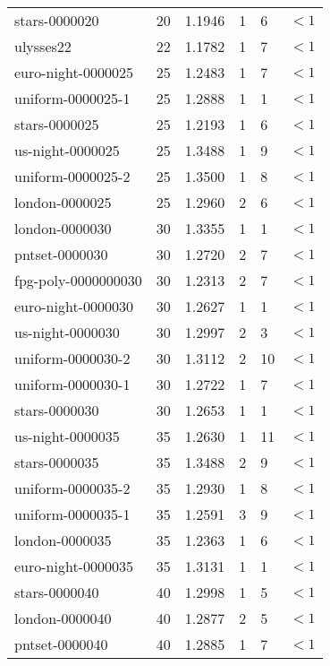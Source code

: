 \begin{longtable}{|lrrlll|}
stars-0000020 & 20 & \num{1.1946} & \num{1} & \num{6} & $<1$ \\
ulysses22 & 22 & \num{1.1782} & \num{1} & \num{7} & $<1$ \\
euro-night-0000025 & 25 & \num{1.2483} & \num{1} & \num{7} & $<1$ \\
uniform-0000025-1 & 25 & \num{1.2888} & \num{1} & \num{1} & $<1$ \\
stars-0000025 & 25 & \num{1.2193} & \num{1} & \num{6} & $<1$ \\
us-night-0000025 & 25 & \num{1.3488} & \num{1} & \num{9} & $<1$ \\
uniform-0000025-2 & 25 & \num{1.3500} & \num{1} & \num{8} & $<1$ \\
london-0000025 & 25 & \num{1.2960} & \num{2} & \num{6} & $<1$ \\
london-0000030 & 30 & \num{1.3355} & \num{1} & \num{1} & $<1$ \\
pntset-0000030 & 30 & \num{1.2720} & \num{2} & \num{7} & $<1$ \\
fpg-poly-0000000030 & 30 & \num{1.2313} & \num{2} & \num{7} & $<1$ \\
euro-night-0000030 & 30 & \num{1.2627} & \num{1} & \num{1} & $<1$ \\
us-night-0000030 & 30 & \num{1.2997} & \num{2} & \num{3} & $<1$ \\
uniform-0000030-2 & 30 & \num{1.3112} & \num{2} & \num{10} & $<1$ \\
uniform-0000030-1 & 30 & \num{1.2722} & \num{1} & \num{7} & $<1$ \\
stars-0000030 & 30 & \num{1.2653} & \num{1} & \num{1} & $<1$ \\
us-night-0000035 & 35 & \num{1.2630} & \num{1} & \num{11} & $<1$ \\
stars-0000035 & 35 & \num{1.3488} & \num{2} & \num{9} & $<1$ \\
uniform-0000035-2 & 35 & \num{1.2930} & \num{1} & \num{8} & $<1$ \\
uniform-0000035-1 & 35 & \num{1.2591} & \num{3} & \num{9} & $<1$ \\
london-0000035 & 35 & \num{1.2363} & \num{1} & \num{6} & $<1$ \\
euro-night-0000035 & 35 & \num{1.3131} & \num{1} & \num{1} & $<1$ \\
stars-0000040 & 40 & \num{1.2998} & \num{1} & \num{5} & $<1$ \\
london-0000040 & 40 & \num{1.2877} & \num{2} & \num{5} & $<1$ \\
pntset-0000040 & 40 & \num{1.2885} & \num{1} & \num{7} & $<1$ \\

\end{longtable}
